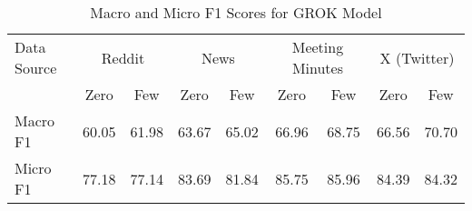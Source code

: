 \begin{table}[htbp]
\centering
\begin{tabular}{l *{8}{c}}
\toprule
Data Source & \multicolumn{2}{c}{Reddit} & \multicolumn{2}{c}{News} & \multicolumn{2}{c}{Meeting Minutes} & \multicolumn{2}{c}{X (Twitter)} \\
& Zero & Few & Zero & Few & Zero & Few & Zero & Few \\
\midrule
Macro F1 & 60.05 & 61.98 & 63.67 & 65.02 & 66.96 & 68.75 & 66.56 & 70.70 \\
Micro F1 & 77.18 & 77.14 & 83.69 & 81.84 & 85.75 & 85.96 & 84.39 & 84.32 \\
\bottomrule
\end{tabular}
\centering\caption{Macro and Micro F1 Scores for GROK Model}
\label{tab:grok_macro_micro}
\end{table}